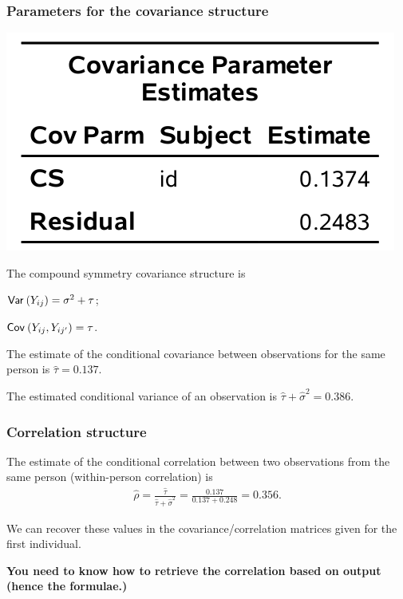 \documentclass{beamer}
\begin{document}
\begin{frame}[fragile]
\frametitle{Parameters for the covariance structure}
\begin{center}
\includegraphics[width = 0.4\linewidth]{img/c5/slides6-e08}
\end{center}
\bi
\item The compound symmetry covariance structure is  
\bi
\item ${\mathsf{Var}_{}}\left(Y_{ij}\right)=\sigma^2+\tau$;
\item ${\mathsf{Cov}_{}}\left(Y_{ij}, Y_{ij'}\right)=\tau$.
\ei
\item The estimate of the conditional covariance between observations for the same person is $\hat{\tau}=0.137$. 
\item The estimated conditional variance of an observation is $\hat{\tau}+ \hat{\sigma}^2= 0.386$.
\ei
\end{frame}

\begin{frame}[fragile]
\frametitle{Correlation structure}
\bi

\item The estimate of the conditional correlation between two observations from the same person (within-person correlation) is
\begin{align*}
\hat{\rho}=\frac{\hat{\tau}}{\hat{\tau}+\hat{\sigma}^2}=\frac{0.137}{0.137+0.248}=0.356.
\end{align*}
\item We can recover these values in the covariance/correlation matrices given for the first individual.
\item \textbf{You need to know how to retrieve the correlation based on output (hence the formulae.)}
\ei
\end{frame}
\end{document}
